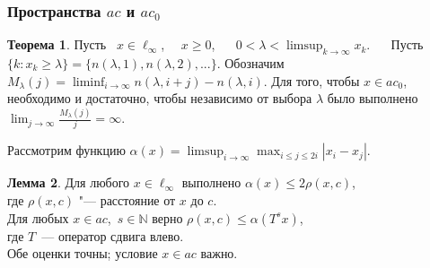 \documentclass[10pt,pdf,hyperref={unicode},aspectratio=169,color={usenames, dvipsnames}]{beamer}
\theoremstyle{definition}
\newtheorem{llemma}{Лемма}
\newtheorem{ttheorem}[llemma]{Теорема}
\begin{document}


\begin{frame}
	\frametitle{Пространства $ac$ и $ac_0$}


	\vspace{0.4em}
	\begin{ttheorem}
		Пусть ~$x\in\ell_\infty$,~~ $x \geq 0$,
		~~
		$\displaystyle
			0<\lambda < \limsup_{k\to\infty} x_k
			.
		$
		~~
		Пусть $\{k: x_k \geq \lambda \} = \{n(\lambda,1),n(\lambda,2),...\}$.
		Обозначим
		$\displaystyle
			M_{\lambda}(j) = \liminf_{i\to\infty} n(\lambda,i+j) - n(\lambda,i)
			.
		$
		Для того, чтобы $x\in ac_0$, необходимо и достаточно, чтобы
		независимо от выбора $\lambda$ было выполнено
		$\displaystyle
			\lim_{j \to \infty} \frac{M_{\lambda}(j)}{j} = \infty
			.
		$
	\end{ttheorem}


	\vspace{0.8em}
	Рассмотрим функцию
	$\displaystyle
		\alpha(x) = \limsup_{i\to\infty} \max_{i \leq j \leq 2i} |x_i-x_j|
	$.


	\begin{llemma}
		Для любого $x\in\ell_\infty$
		выполнено
		$
			\alpha(x) \leq 2\rho(x, c)
		$,
		\\
		где $\rho(x,c)$ "--- расстояние от $x$ до $c$.
		\\
		Для любых $x\in ac$,~$s\in\mathbb{N}$ верно
		$
			\rho(x,c)\leq \alpha(T^s x)
		$,
		\\
		где $T$~--- оператор сдвига влево.%
		\\
		Обе оценки точны;
		условие $x\in ac$ важно.
	\end{llemma}

\end{frame}
\end{document}
